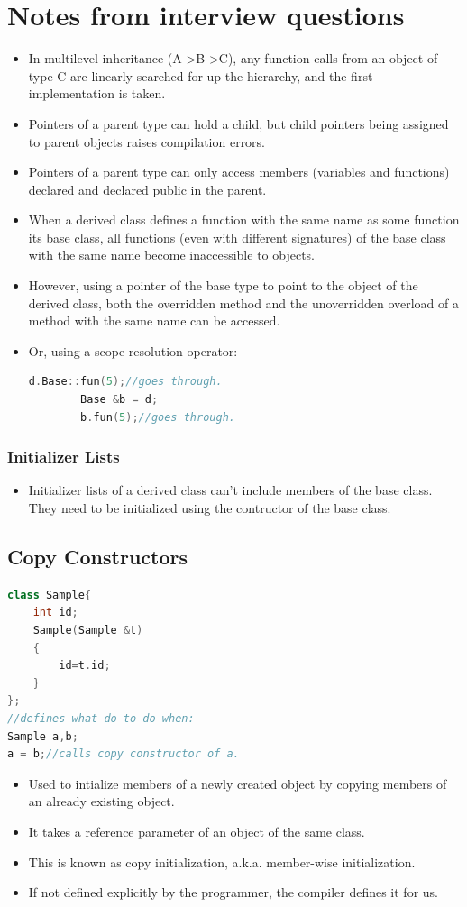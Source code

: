 \documentclass{report}
\begin{document}
\section{Notes from interview questions}
\begin{itemize}
    \item In multilevel inheritance (A->B->C), any function calls from an object of type C are linearly searched for up the hierarchy, and the first implementation is taken.
    \item Pointers of a parent type can hold a child, but child pointers being assigned to parent objects raises compilation errors.
    \item Pointers of a parent type can only access members (variables and functions) declared and declared public in the parent.
    \item When a derived class defines a function with the same name as some function its base class, all functions (even with different signatures) of the base class with the same name become inaccessible to objects.
    \item However, using a pointer of the base type to point to the object of the derived class, both the overridden method and the unoverridden overload of a method with the same name can be accessed.
    \item Or, using a scope resolution operator:
    \begin{lstlisting}[language=C++]
        d.Base::fun(5);//goes through.
        Base &b = d;
        b.fun(5);//goes through.
    \end{lstlisting}
\end{itemize}
\subsubsection{Initializer Lists}
\begin{itemize}
\item Initializer lists of a derived class can't
include members of the base class. They need to be initialized using the contructor of the base class.
\end{itemize}
\subsection{Copy Constructors}
\begin{lstlisting}[language=C++]
class Sample{
    int id;
    Sample(Sample &t)
    {
        id=t.id;
    }
};
//defines what do to do when:
Sample a,b;
a = b;//calls copy constructor of a.
\end{lstlisting}
\begin{itemize}
\item Used to intialize members of a newly created object by copying members of an already existing object.
\item It takes a reference parameter of an object of the same class.
\item This is known as copy initialization, a.k.a. member-wise initialization.
\item If not defined explicitly by the programmer, the compiler 
defines it for us.
\end{itemize}
\end{document}
